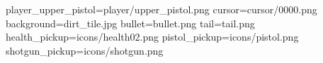 player_upper_pistol=player/upper_pistol.png
cursor=cursor/0000.png
background=dirt_tile.jpg
bullet=bullet.png
tail=tail.png
health_pickup=icons/health02.png
pistol_pickup=icons/pistol.png
shotgun_pickup=icons/shotgun.png
